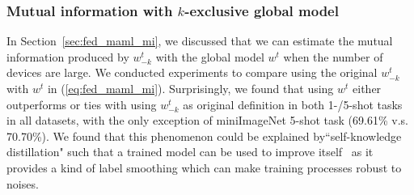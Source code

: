 \subsubsection{Mutual information with $k$-exclusive global model}
\label{sec:ab_mi}
In Section~\ref{sec:fed_maml_mi}, we discussed that we can estimate the mutual information produced by $w_{-k}^t$ with the global model $w^t$ when the number of devices are large. We conducted experiments to compare using the original $w_{-k}^t$ with $w^t$ in (\ref{eq:fed_maml_mi}).
Surprisingly, we found that using $w^t$ either outperforms or ties with using $w_{-k}^t$ as original definition in both 1-/5-shot tasks in all datasets, with the only exception of miniImageNet 5-shot task (69.61\% v.s. 70.70\%). 
We found that this phenomenon could be explained by``self-knowledge distillation" such that a trained model can be used to improve itself~\cite{yun2020regularizing, zhang2020selfdistillation} as it provides a kind of label smoothing which can make training processes robust to noises. 

